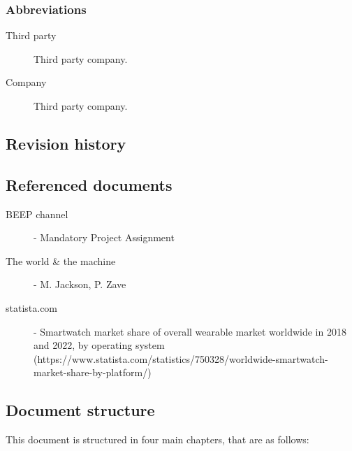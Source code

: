 \documentclass[../main.tex]{subfiles}
\begin{document}
\subsubsection{Abbreviations}
\begin{description}

	\item [Third party] Third party company.
	\item [Company] Third party company.

\end{description}

\subsection{Revision history}
\subsection{Referenced documents}

\begin{minipage}{\textwidth}
\begin{description}
	\item [BEEP channel] - Mandatory Project Assignment
	\item [The world \& the machine] - M. Jackson, P. Zave
	\item [statista.com] - Smartwatch market share of overall wearable market worldwide in 2018 and 2022, by operating system (https://www.statista.com/statistics/750328/worldwide-smartwatch-market-share-by-platform/)
\end{description}
\end{minipage}

\subsection{Document structure}

This document is structured in four main chapters, that are as follows:
\end{document}
